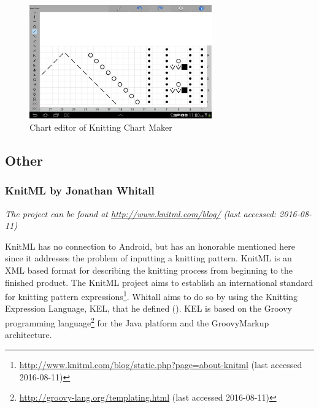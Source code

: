 \begin{figure}[H]
  \begin{center}
\includegraphics[width=0.7\textwidth]{images/image03.png}
\caption[Chart editor of Knitting Chart Maker ]{Chart editor of Knitting Chart Maker}
\label{fig_knittingchartmaker}
\end{center}
\end{figure}

\subsection{Other}

\subsubsection*{KnitML by Jonathan Whitall}

\textit{The project can be found at \url{http://www.knitml.com/blog/} \small{(last accessed: 2016-08-11)}}
\vspace*{0.5cm}

\noindent KnitML has no connection to Android, but has an honorable mentioned here since it addresses the problem of inputting a knitting pattern. KnitML is an XML based format for describing the knitting process from beginning to the finished product. The KnitML project aims to establish an international standard for knitting pattern expressions\footnote{\url{http://www.knitml.com/blog/static.php?page=about-knitml} (last accessed 2016-08-11)}. Whitall aims to do so by using the Knitting Expression Language, KEL, that he defined (\cite{knitml}). KEL is based on the Groovy programming language\footnote{\url{http://groovy-lang.org/templating.html} (last accessed 2016-08-11)} for the Java platform and the GroovyMarkup architecture.

